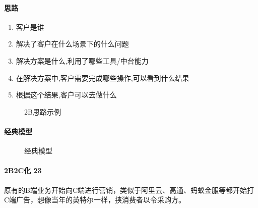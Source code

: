 \documentclass[letterpaper,11pt,english]{sphinxmanual}
\begin{document}
\paragraph{思路}
\label{\detokenize{chapter_introduction/2B:id30}}\begin{enumerate}
%
\item {} 
客户是谁

\item {} 
解决了客户在什么场景下的什么问题

\item {} 
解决方案是什么,利用了哪些工具/中台能力

\item {} 
在解决方案中,客户需要完成哪些操作,可以看到什么结果

\item {} 
根据这个结果,客户可以去做什么

\end{enumerate}

\begin{figure}[H]
\centering
\capstart

\noindent{}
\caption{2B思路示例}\label{\detokenize{chapter_introduction/2B:id41}}\end{figure}


\paragraph{经典模型}
\label{\detokenize{chapter_introduction/2B:id31}}
\begin{figure}[H]
\centering
\capstart

\noindent{}
\caption{经典模型\sphinxfootnotemark[61]}\label{\detokenize{chapter_introduction/2B:id42}}\end{figure}
%
\begin{footnotetext}[61]\sphinxAtStartFootnote
{}
%
\end{footnotetext}\ignorespaces 

\paragraph{2B2C化 23\sphinxfootnotemark[62]}
\label{\detokenize{chapter_introduction/2B:b2c-23}}%
\begin{footnotetext}[62]\sphinxAtStartFootnote
{}
%
\end{footnotetext}\ignorespaces 
原有的B端业务开始向C端进行营销，类似于阿里云、高通、蚂蚁金服等都开始打C端广告，想像当年的英特尔一样，挟消费者以令采购方。
\end{document}
